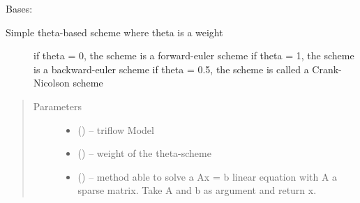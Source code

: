 \documentclass[letterpaper,10pt,english]{sphinxmanual}
\begin{document}
\begin{fulllineitems}
\label{\detokenize{triflow.plugins:triflow.plugins.schemes.Theta}}
Bases: 
\begin{description}
\item[{Simple theta-based scheme where theta is a weight}] \leavevmode
if theta = 0, the scheme is a forward-euler scheme
if theta = 1, the scheme is a backward-euler scheme
if theta = 0.5, the scheme is called a Crank-Nicolson scheme

\end{description}
\begin{quote}\begin{description}
\item[{Parameters}] \leavevmode\begin{itemize}
\item {} 
 () -- triflow Model

\item {} 
 (\sphinxstyleliteralemphasis{, }\sphinxstyleliteralemphasis{, }) -- weight of the theta-scheme

\item {} 
 (\sphinxstyleliteralemphasis{, }\sphinxstyleliteralemphasis{, }) -- method able to solve a Ax = b linear equation with A a sparse matrix. Take A and b as argument and return x.

\end{itemize}

\end{description}\end{quote}


\end{fulllineitems}
\end{document}
